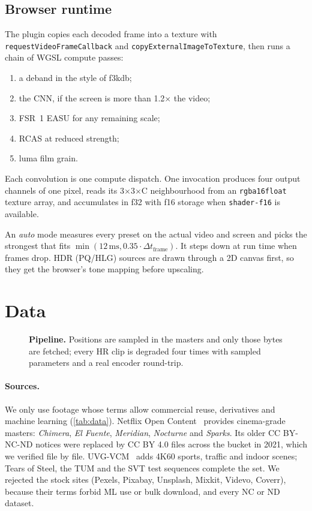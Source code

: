 \documentclass[10pt,twocolumn,letterpaper]{article}
\begin{document}
\subsection{Browser runtime}
\label{sec:runtime}
The plugin copies each decoded frame into a texture with \texttt{requestVideoFrameCallback} and
\texttt{copyExternalImageToTexture}, then runs a chain of WGSL compute passes:
\begin{enumerate}
\setlength\itemsep{0pt}
\item a deband in the style of f3kdb;
\item the CNN, if the screen is more than 1.2$\times$ the video;
\item FSR~1 EASU for any remaining scale;
\item RCAS at reduced strength;
\item luma film grain.
\end{enumerate}
Each convolution is one compute dispatch. One invocation produces four output channels of one
pixel, reads its 3$\times$3$\times$C neighbourhood from an \texttt{rgba16float} texture array, and
accumulates in f32 with f16 storage when \texttt{shader-f16} is available.

An \emph{auto} mode measures every preset on the actual video and screen and picks the strongest
that fits $\min(12\,\mathrm{ms}, 0.35\cdot\Delta t_{\mathrm{frame}})$. It steps down at run time
when frames drop. HDR (PQ/HLG) sources are drawn through a 2D canvas first, so they get the
browser's tone mapping before upscaling.

\section{Data}
\label{sec:data}

\begin{figure}[t]
  \centering
  \resizebox{\columnwidth}{!}{}
  \caption{\textbf{Pipeline.} Positions are sampled in the masters and only those bytes are
  fetched; every HR clip is degraded four times with sampled parameters and a real encoder
  round-trip.}
  \label{fig:pipeline}
\end{figure}

\paragraph{Sources.} We only use footage whose terms allow commercial reuse, derivatives and
machine learning (\cref{tab:data}). Netflix Open Content~\cite{netflixoc} provides cinema-grade
masters: \emph{Chimera}, \emph{El Fuente}, \emph{Meridian}, \emph{Nocturne} and \emph{Sparks}. Its
older CC BY-NC-ND notices were replaced by CC BY 4.0 files across the bucket in 2021, which we
verified file by file. UVG-VCM~\cite{uvgvcm} adds 4K60 sports, traffic and indoor scenes; Tears of
Steel, the TUM and the SVT test sequences complete the set. We rejected the stock sites (Pexels,
Pixabay, Unsplash, Mixkit, Videvo, Coverr), because their terms forbid ML use or bulk download,
and every NC or ND dataset.
\end{document}
